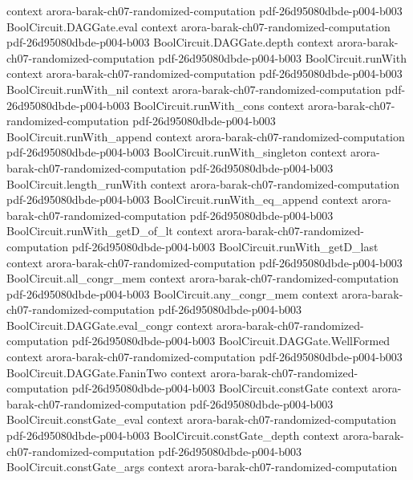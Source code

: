 \begin{theorem}
  {context}
  {arora-barak-ch07-randomized-computation}
  {pdf-26d95080dbde-p004-b003}
\proofstep
  {BoolCircuit.DAGGate.eval}
  {context}
  {arora-barak-ch07-randomized-computation}
  {pdf-26d95080dbde-p004-b003}
\proofstep
  {BoolCircuit.DAGGate.depth}
  {context}
  {arora-barak-ch07-randomized-computation}
  {pdf-26d95080dbde-p004-b003}
\proofstep
  {BoolCircuit.runWith}
  {context}
  {arora-barak-ch07-randomized-computation}
  {pdf-26d95080dbde-p004-b003}
\proofstep
  {BoolCircuit.runWith_nil}
  {context}
  {arora-barak-ch07-randomized-computation}
  {pdf-26d95080dbde-p004-b003}
\proofstep
  {BoolCircuit.runWith_cons}
  {context}
  {arora-barak-ch07-randomized-computation}
  {pdf-26d95080dbde-p004-b003}
\proofstep
  {BoolCircuit.runWith_append}
  {context}
  {arora-barak-ch07-randomized-computation}
  {pdf-26d95080dbde-p004-b003}
\proofstep
  {BoolCircuit.runWith_singleton}
  {context}
  {arora-barak-ch07-randomized-computation}
  {pdf-26d95080dbde-p004-b003}
\proofstep
  {BoolCircuit.length_runWith}
  {context}
  {arora-barak-ch07-randomized-computation}
  {pdf-26d95080dbde-p004-b003}
\proofstep
  {BoolCircuit.runWith_eq_append}
  {context}
  {arora-barak-ch07-randomized-computation}
  {pdf-26d95080dbde-p004-b003}
\proofstep
  {BoolCircuit.runWith_getD_of_lt}
  {context}
  {arora-barak-ch07-randomized-computation}
  {pdf-26d95080dbde-p004-b003}
\proofstep
  {BoolCircuit.runWith_getD_last}
  {context}
  {arora-barak-ch07-randomized-computation}
  {pdf-26d95080dbde-p004-b003}
\proofstep
  {BoolCircuit.all_congr_mem}
  {context}
  {arora-barak-ch07-randomized-computation}
  {pdf-26d95080dbde-p004-b003}
\proofstep
  {BoolCircuit.any_congr_mem}
  {context}
  {arora-barak-ch07-randomized-computation}
  {pdf-26d95080dbde-p004-b003}
\proofstep
  {BoolCircuit.DAGGate.eval_congr}
  {context}
  {arora-barak-ch07-randomized-computation}
  {pdf-26d95080dbde-p004-b003}
\proofstep
  {BoolCircuit.DAGGate.WellFormed}
  {context}
  {arora-barak-ch07-randomized-computation}
  {pdf-26d95080dbde-p004-b003}
\proofstep
  {BoolCircuit.DAGGate.FaninTwo}
  {context}
  {arora-barak-ch07-randomized-computation}
  {pdf-26d95080dbde-p004-b003}
\proofstep
  {BoolCircuit.constGate}
  {context}
  {arora-barak-ch07-randomized-computation}
  {pdf-26d95080dbde-p004-b003}
\proofstep
  {BoolCircuit.constGate_eval}
  {context}
  {arora-barak-ch07-randomized-computation}
  {pdf-26d95080dbde-p004-b003}
\proofstep
  {BoolCircuit.constGate_depth}
  {context}
  {arora-barak-ch07-randomized-computation}
  {pdf-26d95080dbde-p004-b003}
\proofstep
  {BoolCircuit.constGate_args}
  {context}
  {arora-barak-ch07-randomized-computation}

\end{theorem}
